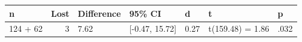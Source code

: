 \begin{tabular}{lrlllll}
  \toprule
n & Lost & Difference & 95\% CI & d & t & p \\ 
  \midrule
124 + 62 &   3 & 7.62 & [-0.47, 15.72] & 0.27 & t(159.48) = 1.86 & .032 \\ 
   \bottomrule
\end{tabular}
